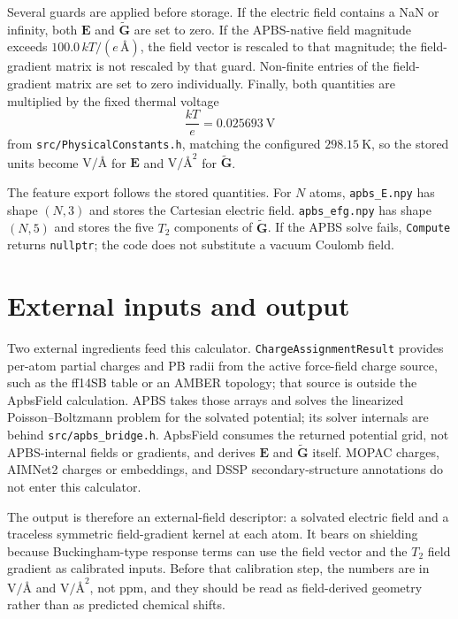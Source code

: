 \documentclass[11pt]{article}
\begin{document}
Several guards are applied before storage. If the electric field contains a
NaN or infinity, both \(\bm E\) and \(\widetilde{\bm G}\) are set to zero. If
the APBS-native field magnitude exceeds \(100.0\,kT/(e\,\si{\angstrom})\), the
field vector is rescaled to that magnitude; the field-gradient matrix is not
rescaled by that guard. Non-finite entries of the field-gradient matrix are set
to zero individually. Finally, both quantities are multiplied by the fixed
thermal voltage
\begin{equation}
  \frac{kT}{e} = \SI{0.025693}{\volt}
\end{equation}
from \texttt{src/PhysicalConstants.h}, matching the configured
\(\SI{298.15}{\kelvin}\), so the stored units become
\(\si{\volt\per\angstrom}\) for \(\bm E\) and
\(\si{\volt\per\angstrom\squared}\) for \(\widetilde{\bm G}\).

The feature export follows the stored quantities. For \(N\) atoms,
\texttt{apbs\_E.npy} has shape \((N,3)\) and stores the Cartesian electric
field. \texttt{apbs\_efg.npy} has shape \((N,5)\) and stores the five
\(T_2\) components of \(\widetilde{\bm G}\). If the APBS solve fails,
\texttt{Compute} returns
\texttt{nullptr}; the code does not substitute a vacuum Coulomb field.

\section{External inputs and output}

Two external ingredients feed this calculator. \texttt{ChargeAssignmentResult}
provides per-atom partial charges and PB radii from the active force-field
charge source, such as the ff14SB table or an AMBER topology; that source is
outside the ApbsField calculation. APBS takes those arrays and solves the
linearized Poisson--Boltzmann problem for the solvated potential; its solver
internals are behind \texttt{src/apbs\_bridge.h}. ApbsField consumes the
returned potential grid, not APBS-internal fields or gradients, and derives
\(\bm E\) and \(\widetilde{\bm G}\) itself. MOPAC charges, AIMNet2 charges or
embeddings, and DSSP secondary-structure annotations do not enter this
calculator.

The output is therefore an external-field descriptor: a solvated electric field
and a traceless symmetric field-gradient kernel at each atom. It bears on
shielding because Buckingham-type response terms can use the field vector and
the \(T_2\) field gradient as calibrated inputs. Before that calibration step,
the numbers are in \(\si{\volt\per\angstrom}\) and
\(\si{\volt\per\angstrom\squared}\), not ppm, and they should be read as
field-derived geometry rather than as predicted chemical shifts.
\end{document}
